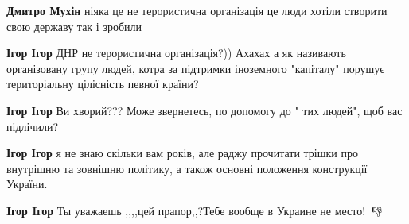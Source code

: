 \begin{itemize}
\begin{itemize}
\begin{itemize}
 
\textbf{Дмитро Мухін} ніяка це не терористична організація це люди хотіли
створити свою державу так і зробили

 
\textbf{Ігор Ігор} ДНР не терористична організація?)) Ахахах а як називають
організовану групу людей, котра за підтримки іноземного "капіталу" порушує
територіальну цілісність певної країни?

 
\textbf{Ігор Ігор} Ви хворий??? Може звернетесь, по допомогу до " тих людей", щоб вас підлічили?

 
\textbf{Ігор Ігор} я не знаю скільки вам років, але раджу прочитати трішки про
внутрішню та зовнішню політику, а також основні положення конструкції України.
\end{itemize}

 
\textbf{Iгор Iгор} Ты уважаешь ,,,,цей прапор,,?Тебе вообще в Украине не место!🤑🤑👎

\begin{itemize}
 

\end{itemize}
\end{itemize}
\end{itemize}
